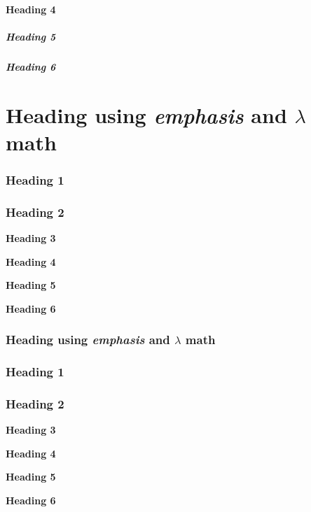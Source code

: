 \paragraph{Heading 4}
\subparagraph{Heading 5}
\subparagraph{Heading 6}

\section{Heading using \emph{emphasis} and $\lambda$ math}
\begin{frame}[t]
\frametitle{Heading 1}

\end{frame}

\begin{frame}[t]
\frametitle{Heading 2}
\par\medskip\noindent\textbf{Heading 3}\par

\par\medskip\noindent\textbf{Heading 4}\par

\par\medskip\noindent\textbf{Heading 5}\par

\par\medskip\noindent\textbf{Heading 6}\par


\end{frame}

\begin{frame}[t]
\frametitle{Heading using \emph{emphasis} and $\lambda$ math}

\end{frame}

\begin{frame}[t]
\frametitle{Heading 1}

\end{frame}

\begin{frame}[t]
\frametitle{Heading 2}
\par\medskip\noindent\textbf{Heading 3}\par

\par\medskip\noindent\textbf{Heading 4}\par

\par\medskip\noindent\textbf{Heading 5}\par

\par\medskip\noindent\textbf{Heading 6}\par


\end{frame}

